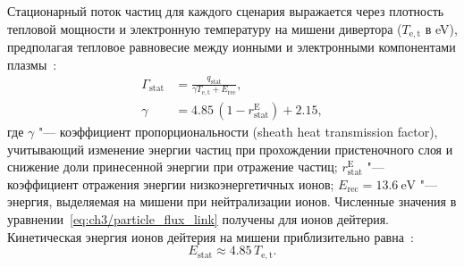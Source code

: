 Стационарный поток частиц для каждого сценария выражается через плотность тепловой мощности и электронную температуру на мишени дивертора ($T_{\mathrm{e,t}}$ в \si{\electronvolt}), предполагая тепловое равновесие между ионными и электронными компонентами плазмы~\cite{Brida2017, Stangeby2000}:
\begin{subequations}
	\label{eq:ch3/particle_flux_link}
	\begin{align}
		\Gamma_{\mathrm{stat}} & =\frac{q_{\mathrm{stat}}}{\gamma T_{\mathrm{e,t}} + E_{\mathrm{rec}}}, \\
		\gamma                 & =4.85\,(1-r_{\mathrm{stat}}^{\mathrm{E}})+2.15,
	\end{align}
\end{subequations}
где $\gamma$ "--- коэффициент пропорциональности (sheath heat transmission factor), учитывающий изменение энергии частиц при прохождении пристеночного слоя и снижение доли принесенной энергии при отражение частиц; $r_{\mathrm{stat}}^{\mathrm{E}}$ "--- коэффициент отражения энергии низкоэнергетичных ионов; $E_{\mathrm{rec}}=\SI{13.6}{\electronvolt}$ "--- энергия, выделяемая на мишени при нейтрализации ионов. Численные значения в уравнении~\cref{eq:ch3/particle_flux_link} получены для ионов дейтерия. Кинетическая энергия ионов дейтерия на мишени приблизительно равна~\cite{Brida2017}:
\begin{equation}
	\label{eq:ch3/stat_energy}
	E_{\mathrm{stat}}\approx 4.85\, T_{\mathrm{e,t}}.
\end{equation}

